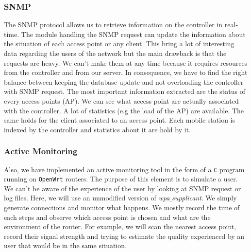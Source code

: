 \subsubsection{SNMP}
The SNMP protocol allows us to retrieve information on the controller in real-time. The module handling the SNMP request can update the information about the situation of each access point or any client. This bring a lot of interesting data regarding the users of the network but the main drawback is that the requests are heavy. We can't make them at any time because it requires resources from the controller and from our server. In consequence, we have to find the right balance between keeping the database update and not overloading the controller with SNMP request.
The most important information extracted are the status of every access points (AP). We can see what access point are actually associated with the controller. A lot of statistics (e.g the load of the AP) are available.
The same holds for the client associated to an access point. Each mobile station is indexed by the controller and statistics about it are hold by it.

\subsubsection{Active Monitoring}
Also, we have implemented an active monitoring tool in the form of a \texttt{C} program running on \texttt{OpenWrt} routers. The purpose of this element is to simulate a user. We can't be aware of the experience of the user by looking at SNMP request or log files. Here, we will use an unmodified version of \emph{wpa$\_$supplicant}. We simply generate connections and monitor what happens. We mostly record the time of each steps and observe which access point is chosen and what are the environment of the router. For example, we will scan the nearest access point, record their signal strength and trying to estimate the quality experienced by an user that would be in the same situation.

